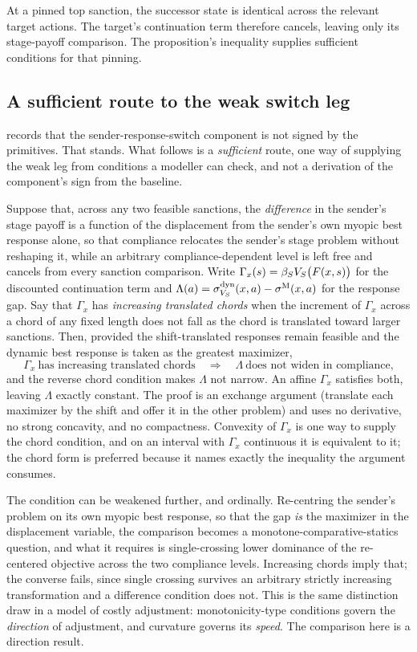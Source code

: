 At a pinned top sanction, the successor state is identical across the
relevant target actions. The target's continuation term therefore
cancels, leaving only its stage-payoff comparison. The proposition's
inequality supplies sufficient conditions for that pinning.

\subsection{A sufficient route to the weak switch leg}
\label{app:switch-route}

 records that the sender-response-switch component is not
signed by the primitives. That stands. What follows is a \emph{sufficient} route,
one way of supplying the weak leg from conditions a modeller can check, and
not a derivation of the component's sign from the baseline.

Suppose that, across any two feasible sanctions, the \emph{difference} in the
sender's stage payoff is a function of the displacement from the sender's own
myopic best response alone, so that compliance relocates the sender's stage
problem without reshaping it, while an arbitrary compliance-dependent level is
left free and cancels from every sanction comparison. Write
$\Gamma_x(s)=\beta_SV_S\bigl(F(x,s)\bigr)$ for the discounted continuation term and
$\Lambda(a)=\sigma^{\mathrm{dyn}}_{V_S}(x,a)-\sigma^{\mathrm{M}}(x,a)$ for the response gap. Say that
$\Gamma_x$ has \emph{increasing translated chords} when the increment of $\Gamma_x$ across
a chord of any fixed length does not fall as the chord is translated toward
larger sanctions. Then, provided the shift-translated responses remain feasible
and the dynamic best response is taken as the greatest maximizer,
\[
\Gamma_x\ \text{has increasing translated chords}
\quad\Longrightarrow\quad
\Lambda\ \text{does not widen in compliance,}
\]
and the reverse chord condition makes $\Lambda$ not narrow. An affine $\Gamma_x$
satisfies both, leaving $\Lambda$ exactly constant. The proof is an exchange
argument (translate each maximizer by the shift and offer it in the other
problem) and uses no derivative, no strong concavity, and no compactness.
Convexity of $\Gamma_x$ is one way to supply the chord condition, and on an interval
with $\Gamma_x$ continuous it is equivalent to it; the chord form is preferred because
it names exactly the inequality the argument consumes.

The condition can be weakened further, and ordinally. Re-centring the sender's
problem on its own myopic best response, so that the gap \emph{is} the maximizer in
the displacement variable, the comparison becomes a monotone-comparative-statics
question, and what it requires is single-crossing lower dominance of the
re-centered objective across the two compliance levels. Increasing chords imply
that; the converse fails, since single crossing survives an arbitrary strictly
increasing transformation and a difference condition does not. This is the same
distinction \citet{DekelQuahSinander2025} draw in a model of costly adjustment:
monotonicity-type conditions govern the \emph{direction} of adjustment, and
curvature governs its \emph{speed}. The comparison here is a direction result.

